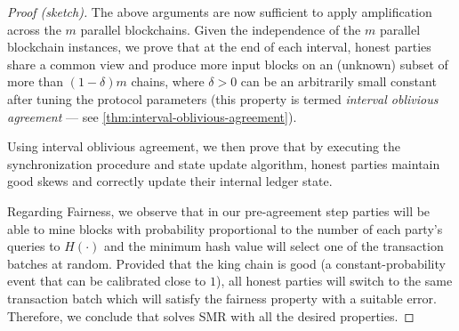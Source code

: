 \begin{proof}[Proof (sketch)]
    The above arguments are now sufficient to apply amplification across the $m$ parallel blockchains.
    Given the independence of the $m$ parallel blockchain instances, we prove that at the end of each interval, honest parties share a common view and produce more input blocks on an (unknown) subset of more than $(1 - \delta)m$ chains, where $\delta > 0$ can be an arbitrarily small constant after tuning the protocol parameters (this property is termed \emph{interval oblivious agreement} --- see \cref{thm:interval-oblivious-agreement}).

    Using interval oblivious agreement, we then prove that by executing the synchronization procedure and state update algorithm, honest parties maintain good skews and correctly update their internal ledger state.

    Regarding Fairness, we observe that in our pre-agreement step parties will be able to mine blocks with probability proportional to the number of each party's queries to $H(\cdot)$ and the minimum hash value will select one of the transaction batches at random.
    Provided that the king chain is good (a constant-probability event that can be calibrated close to $1$), all honest parties will switch to the same transaction batch which will satisfy the fairness property with a suitable error.
    Therefore, we conclude that \pSMR solves SMR with all the desired properties.
\end{proof}
